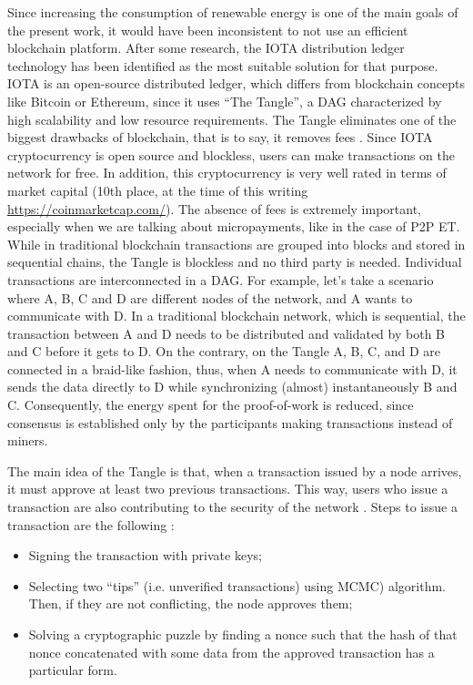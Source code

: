 Since increasing the consumption of renewable energy is one of the main goals of the present work, it would have been inconsistent to not use an efficient blockchain platform. After some research, the IOTA distribution ledger technology has been identified as the most suitable solution for that purpose. IOTA is an open-source distributed ledger, which differs from blockchain concepts like Bitcoin or Ethereum, since it uses “The Tangle”, a \ac{DAG} characterized by high scalability and low resource requirements. The Tangle eliminates one of the biggest drawbacks of blockchain, that is to say, it removes fees \cite{WhatisIOTA}. Since IOTA cryptocurrency is open source and blockless, users can make transactions on the network for free. In addition, this cryptocurrency is very well rated in terms of market capital (10th place, at the time of this writing \url{https://coinmarketcap.com/}).  The absence of fees is extremely important, especially when we are talking about micropayments, like in the case of \ac{P2P} \ac{ET}. While in traditional blockchain transactions are grouped into blocks and stored in sequential chains, the Tangle is blockless and no third party is needed. Individual transactions are interconnected in a \ac{DAG}. For example, let’s take a scenario where A, B, C and D are different nodes of the network, and A wants to communicate with D. In a traditional blockchain network, which is sequential, the transaction between A and D needs to be distributed and validated by both B and C before it gets to D. On the contrary, on the Tangle A, B, C, and D are connected in a braid-like fashion, thus, when A needs to communicate with D, it sends the data directly to D while synchronizing (almost) instantaneously B and C. Consequently, the energy spent for the proof-of-work is reduced, since consensus is established only by the participants making transactions instead of miners.


The main idea of the Tangle is that, when a transaction issued by a node arrives, it must approve at least two previous transactions. This way, users who issue a transaction are also contributing to the security of the network \cite{TheTangle}. Steps to issue a transaction are the following \cite{TheTangle}:

\begin{itemize}
    \item Signing the transaction with private keys;
    \item Selecting two “tips” (i.e. unverified transactions) using \ac{MCMC}) algorithm. Then, if they are not conflicting, the node approves them;
    \item Solving a cryptographic puzzle by finding a nonce such that the hash of that nonce concatenated with some data from the approved transaction has a particular form.
\end{itemize}

